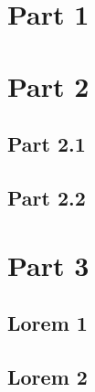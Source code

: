\documentclass[a4paper,12pt]{insa} %
\begin{document}
\dosecttoc{}	  %
\pagestyle{fancy} %

\maketitle        %
\makecoverpage    %
\entete           %
\pieddepage       %

\tableofcontents

\clearpage

\lipsum*[1]

\clearpage

\section{Part 1}
\lipsum

\clearpage

\section{Part 2}
\lipsum*[1]
\subsection{Part 2.1}
\lipsum
\subsection{Part 2.2}
\lipsum

\clearpage

\section{Part 3}
\lipsum*[1]

\clearpage

\lipsum*[1]


\enteteanexe

\subsection{Lorem 1}
\lipsum

\clearpage

\subsection{Lorem 2}
\lipsum


\makefourthcover    %
\end{document}
